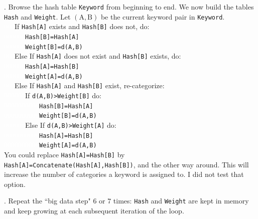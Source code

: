 \documentclass[oneside,10pt]{book}
\begin{document}
. Browse the hash table \texttt{Keyword} from beginning to end. 
We now build the tables \texttt{Hash} and \texttt{Weight}. Let $(\text{A}, \text{B})$ be the current keyword pair in \texttt{Keyword}. \vspace{1ex}\\
\textcolor{white}{000}If \texttt{Hash[A]} exists and \texttt{Hash[B]} does not, do: \\
\textcolor{white}{000000}\texttt{Hash[B]=Hash[A]} \\
\textcolor{white}{000000}\texttt{Weight[B]=d(A,B) }\\
\textcolor{white}{000}Else If \texttt{Hash[A]} does not exist and \texttt{Hash[B]} exists, do: \\
\textcolor{white}{000000}\texttt{Hash[A]=Hash[B]} \\
\textcolor{white}{000000}\texttt{Weight[A]=d(A,B) } \\
\textcolor{white}{000}Else If \texttt{Hash[A]} and \texttt{Hash[B]} exist, re-categorize: \\
\textcolor{white}{000000}If \texttt{d(A,B)>Weight[B]} do:\\
\textcolor{white}{0000000000}\texttt{Hash[B]=Hash[A]} \\
\textcolor{white}{0000000000}\texttt{Weight[B]=d(A,B)}\\
\textcolor{white}{000000}Else If \texttt{d(A,B)>Weight[A]} do: \\
\textcolor{white}{0000000000}\texttt{Hash[A]=Hash[B]} \\
 \textcolor{white}{0000000000}\texttt{Weight[A]=d(A,B)}\vspace{1ex} \\
\noindent You could replace \texttt{Hash[A]=Hash[B]} by \texttt{Hash[A]=Concatenate(Hash[A],Hash[B])}, and the other way around. This will
 increase the number of categories a keyword is assigned to. I did not test that option.
\vspace{1ex}

. Repeat the ``big data step" $6$ or $7$ times: \texttt{Hash} and \texttt{Weight} are kept in memory and keep growing at each subsequent iteration of the loop.
\vspace{1ex}
\end{document}
